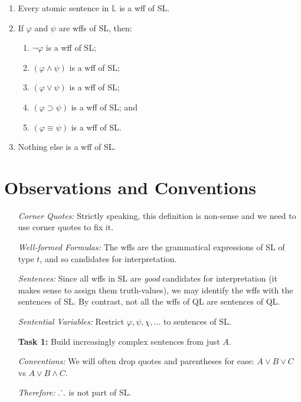\documentclass[a4paper, 11pt]{article} %
\def\therefore{\ensuremath{\ldotp\dot{}\,\ldotp}}
\begin{document}
\begin{enumerate}[leftmargin=1.5in,labelsep=.15in] %
  \item Every atomic sentence in $\mathbb{L}$ is a wff of SL.
  \item If $\varphi$ and $\psi$ are wffs of SL, then:
    \begin{enumerate}
      \item $\neg\varphi$ is a wff of SL;
      \item $(\varphi\wedge\psi)$ is a wff of SL;
      \item $(\varphi\vee\psi)$ is a wff of SL;
      \item $(\varphi\supset\psi)$ is a wff of SL; and
      \item $(\varphi\equiv\psi)$ is a wff of SL.
    \end{enumerate}
  \item Nothing else is a wff of SL.
\end{enumerate}




\section*{Observations and Conventions}

\begin{enumerate}[leftmargin=1.5in,labelsep=.15in] %
  \item[\it Corner Quotes:] Strictly speaking, this definition is non-sense and we need to use corner quotes to fix it.
  \item[\it Well-formed Formulas:] The wffs are the grammatical expressions of SL of type $t$, and so candidates for interpretation.
  \item[\it Sentences:] Since all wffs in SL are \textit{good} candidates for interpretation (it makes sense to assign them truth-values), we may identify the wffs with the sentences of SL. By contrast, not all the wffs of QL are sentences of QL.
  \item[\it Sentential Variables:] Restrict $\varphi,\psi,\chi,\ldots$ to sentences of SL.
  \item[\bf Task 1:] Build increasingly complex sentences from just $A$.
  \item[\it Conventions:] We will often drop quotes and parentheses for ease: $A\vee B\vee C$ vs $A\vee B\wedge C$.
  \item[\it Therefore:] $\therefore$ is not part of SL.
\end{enumerate}
\end{document}
